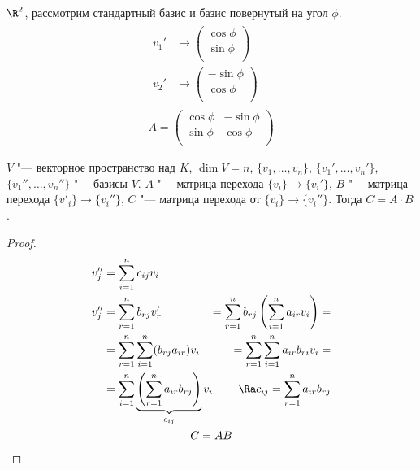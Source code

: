 \begin{exmp}
	$\R^2$, рассмотрим стандартный базис и базис повернутый на угол $\phi$.
	\begin{gather*}
		\begin{aligned}
			v_1' &\to
				\begin{pmatrix}
					\cos \phi\\
					\sin \phi\\
				\end{pmatrix} \\
			v_2' &\to
				\begin{pmatrix}
					-\sin \phi\\
					\cos \phi\\
				\end{pmatrix}
		\end{aligned} \\
		A =
		\begin{pmatrix}
			\cos \phi & -\sin \phi\\
			\sin \phi & \cos \phi\\
		\end{pmatrix}
	\end{gather*}
\end{exmp}

\begin{theorem}
	$V$ "--- векторное пространство над $K$, $\dim V = n$,
	$\{v_1, \dots, v_n\}$, $\{v_1', \dots, v_n'\}$, $\{v_1'', \dots, v_n''\}$  "--- базисы $V$.
	$A$ "--- матрица перехода $\{v_i\} \to \{v_i'\}$,
	$B$ "--- матрица перехода $\{v'_i\} \to \{v_i''\}$,
	$C$ "--- матрица перехода от $\{v_i\} \to \{v_i''\}$.
	Тогда $C = A \cdot B$.
\end{theorem}
\begin{proof}
	\begin{gather*}
		\begin{alignedat}{3}
			v_j'' &= \sum_{i = 1}^{n}c_{ij}v_i &\\
			v_j'' &= \sum_{r = 1}^{n}b_{rj}v_r' &= \sum_{r = 1}^{n}b_{rj}\left(\sum_{i = 1}^{n}a_{ir}v_i\right) = \\
			      &= \sum_{r = 1}^{n}\sum_{i = 1}^{n}(b_{rj}a_{ir})v_i &= \sum_{r = 1}^{n}\sum_{i = 1}^{n}a_{ir}b_{ri}v_i = \\
			      &= \sum_{i = 1}^{n}\underbrace{\left(\sum_{r = 1}^{n}a_{ir} b_{rj}\right)}_{c_{ij}} v_i
			        &\Ra c_{ij} = \sum_{r = 1}^{n}a_{ir}b_{rj}
		\end{alignedat} \\
		C = AB
	\end{gather*}
\end{proof}

